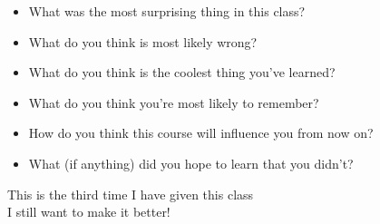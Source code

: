 \documentclass[a4paper,landscape,headrule,footrule,xetex]{foils}
\begin{document}
\begin{itemize}
\item What was the most surprising thing in this class?
\item What do you think is most likely wrong?
\item What do you think is the coolest thing you've learned?
\item What do you think you're most likely to
remember?
\item How do you think this course will influence you from now on?
\item What (if anything) did you hope to learn that you didn't?
\end{itemize}
\bigskip\bigskip
\begin{center}
  This is the third time I have given this class \\
  I still want to make it better!
\end{center}
\end{document}
